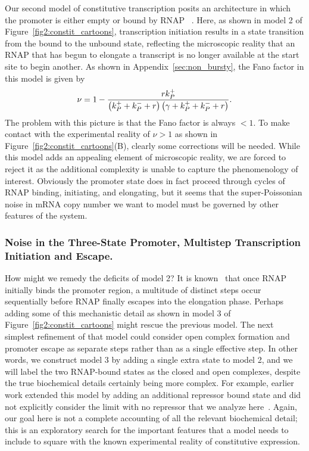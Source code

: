 Our second model of constitutive transcription posits an architecture in which
the promoter is either empty or bound by RNAP ~\cite{Phillips2015a,
Phillips2019}. Here,  as shown in model 2 of Figure~\ref{fig2:constit_cartoons},
transcription initiation results in a state transition from the bound to the
unbound state, reflecting the microscopic reality that an RNAP that has begun to
elongate a transcript is no longer available at the start site to begin another.
As shown in Appendix~\ref{sec:non_bursty}, the Fano factor in this model is
given by
\begin{align}
    \nu = 1 -
        \frac{r{k}_{P}^{+}}
            {\left({k}_{P}^{+} + {k}_{P}^{-} + r\right)
             \left(\gamma + {k}_{P}^{+} + {k}_{P}^{-} + r\right)}.
\end{align}
The problem with this picture is that the Fano factor is always $<1$. To make
 contact with the experimental reality of $\nu>1$ as shown in
 Figure~\ref{fig2:constit_cartoons}(B), clearly some corrections will be needed.
 While this model adds an appealing element of microscopic reality, we are
 forced to reject it as the additional complexity is unable to capture the
 phenomenology of interest. Obviously the promoter state does in fact proceed
 through cycles of RNAP binding, initiating, and elongating, but it seems that
 the super-Poissonian noise in mRNA copy number we want to model must be
 governed by other features of the system.

\subsubsection{Noise in the Three-State Promoter, Multistep Transcription
Initiation and Escape.} 

How might we remedy the deficits of model 2? It is known~\cite{DeHaseth1998}
that once RNAP initially binds the promoter region, a multitude of distinct
steps occur sequentially before RNAP finally escapes into the elongation phase.
Perhaps adding some of this mechanistic detail as shown in model 3 of
Figure~\ref{fig2:constit_cartoons} might rescue the previous model. The next
simplest refinement of that model could consider open complex formation and
promoter escape as separate steps rather than as a single effective step. In
other words, we construct model 3 by adding a single extra state to model 2, and
we will label the two RNAP-bound states as the closed and open complexes,
despite the true biochemical details certainly being more complex. For example,
earlier work extended this model by adding an additional repressor bound state
and did not explicitly consider the limit with no repressor that we analyze
here~\cite{Mitarai2015}. Again, our goal here is not a complete accounting of
all the relevant biochemical detail; this is an exploratory search for the
important features that a model needs to include to square with the known
experimental reality of constitutive expression.

